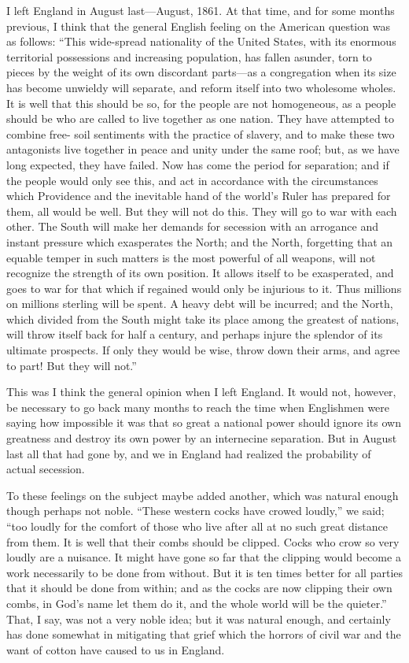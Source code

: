 I left England in August last---August, 1861.  At that time, and for
some months previous, I think that the general English feeling on
the American question was as follows: ``This wide-spread nationality
of the United States, with its enormous territorial possessions and
increasing population, has fallen asunder, torn to pieces by the
weight of its own discordant parts---as a congregation when its size
has become unwieldy will separate, and reform itself into two
wholesome wholes.  It is well that this should be so, for the
people are not homogeneous, as a people should be who are called to
live together as one nation.  They have attempted to combine free-
soil sentiments with the practice of slavery, and to make these two
antagonists live together in peace and unity under the same roof;
but, as we have long expected, they have failed.  Now has come the
period for separation; and if the people would only see this, and
act in accordance with the circumstances which Providence and the
inevitable hand of the world's Ruler has prepared for them, all
would be well.  But they will not do this.  They will go to war
with each other.  The South will make her demands for secession
with an arrogance and instant pressure which exasperates the North;
and the North, forgetting that an equable temper in such matters is
the most powerful of all weapons, will not recognize the strength
of its own position.  It allows itself to be exasperated, and goes
to war for that which if regained would only be injurious to it.
Thus millions on millions sterling will be spent.  A heavy debt
will be incurred; and the North, which divided from the South might
take its place among the greatest of nations, will throw itself
back for half a century, and perhaps injure the splendor of its
ultimate prospects.  If only they would be wise, throw down their
arms, and agree to part!  But they will not.''

This was I think the general opinion when I left England.  It would
not, however, be necessary to go back many months to reach the time
when Englishmen were saying how impossible it was that so great a
national power should ignore its own greatness and destroy its own
power by an internecine separation.  But in August last all that
had gone by, and we in England had realized the probability of
actual secession.

To these feelings on the subject maybe added another, which was
natural enough though perhaps not noble.  ``These western cocks have
crowed loudly,'' we said; ``too loudly for the comfort of those who
live after all at no such great distance from them.  It is well
that their combs should be clipped.  Cocks who crow so very loudly
are a nuisance.  It might have gone so far that the clipping would
become a work necessarily to be done from without.  But it is ten
times better for all parties that it should be done from within;
and as the cocks are now clipping their own combs, in God's name
let them do it, and the whole world will be the quieter.''  That, I
say, was not a very noble idea; but it was natural enough, and
certainly has done somewhat in mitigating that grief which the
horrors of civil war and the want of cotton have caused to us in
England.

